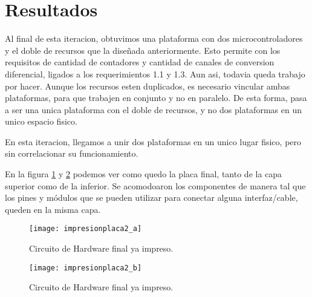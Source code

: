 
\section{Resultados} %
\label{sec:resultados}


Al final de esta iteracion, obtuvimos una plataforma con dos microcontroladores y el doble de recursos que la diseñada anteriormente. Esto permite con los requisitos de cantidad de contadores y cantidad de canales de conversion diferencial, ligados a los requerimientos 1.1 y 1.3.
Aun asi, todavia queda trabajo por hacer. Aunque los recursos esten duplicados, es necesario vincular ambas plataformas, para que trabajen en conjunto y no en paralelo. De esta forma, pasa a ser una unica plataforma con el doble de recursos, y no dos plataformas en un unico espacio fisico.

En esta iteracion, llegamos a unir dos plataformas en un unico lugar fisico, pero sin correlacionar su funcionamiento.

En la figura \ref{fig:impresionplaca2_a} y \ref{fig:impresionplaca2_b} podemos ver como quedo la placa final, tanto de la capa superior como de la inferior. Se acomodoaron los componentes de manera tal que los pines y módulos que se pueden utilizar para conectar alguna interfaz/cable, queden en la misma capa.

\begin{figure}  
\centering
  \texttt{[image: impresionplaca2\_a]}
  \caption{Circuito de Hardware final ya impreso.}\label{fig:impresionplaca2_a}
\end{figure}

\begin{figure}  
\centering
  \texttt{[image: impresionplaca2\_b]}
  \caption{Circuito de Hardware final ya impreso.}\label{fig:impresionplaca2_b}
\end{figure}




